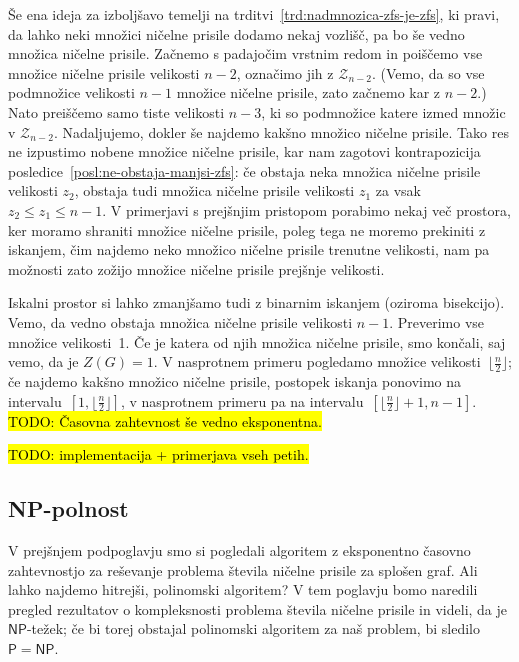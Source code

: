 \documentclass[12pt,a4paper,twoside]{article}
\theoremstyle{definition} %
\theoremstyle{plain} %
\numberwithin{equation}{section}  %
\renewcommand{\P}{\ensuremath{\mathsf{P}}}
\newcommand{\NP}{\ensuremath{\mathsf{NP}}}
\begin{document}
Še ena ideja za izboljšavo temelji na trditvi~\ref{trd:nadmnozica-zfs-je-zfs}, ki pravi, da lahko neki množici ničelne prisile dodamo nekaj vozlišč, pa bo še vedno množica ničelne prisile. Začnemo s padajočim vrstnim redom in poiščemo vse množice ničelne prisile velikosti $n-2$, označimo jih z $\mathcal{Z}_{n-2}$. (Vemo, da so vse podmnožice velikosti $n-1$ množice ničelne prisile, zato začnemo kar z $n-2$.) Nato preiščemo samo tiste velikosti $n-3$, ki so podmnožice katere izmed množic v $\mathcal{Z}_{n-2}$. Nadaljujemo, dokler še najdemo kakšno množico ničelne prisile.
Tako res ne izpustimo nobene množice ničelne prisile, kar nam zagotovi kontrapozicija posledice~\ref{posl:ne-obstaja-manjsi-zfs}: če obstaja neka množica ničelne prisile velikosti $z_2$, obstaja tudi množica ničelne prisile velikosti $z_1$ za vsak $z_2 \leq z_1 \leq n-1$.
V primerjavi s prejšnjim pristopom porabimo nekaj več prostora, ker moramo shraniti množice ničelne prisile, poleg tega ne moremo prekiniti z iskanjem, čim najdemo neko množico ničelne prisile trenutne velikosti, nam pa možnosti zato zožijo množice ničelne prisile prejšnje velikosti.

Iskalni prostor si lahko zmanjšamo tudi z binarnim iskanjem (oziroma bisekcijo). Vemo, da vedno obstaja množica ničelne prisile velikosti $n-1$. Preverimo vse množice velikosti~1. Če je katera od njih množica ničelne prisile, smo končali, saj vemo, da je $Z(G) = 1$. V nasprotnem primeru pogledamo množice velikosti~$\lfloor \frac{n}{2} \rfloor$; če najdemo kakšno množico ničelne prisile, postopek iskanja ponovimo na intervalu~$[1,\lfloor \frac{n}{2} \rfloor]$, v nasprotnem primeru pa na intervalu~$[\lfloor \frac{n}{2} \rfloor + 1, n-1]$. \hl{TODO: Časovna zahtevnost še vedno eksponentna.}

\hl{TODO: implementacija + primerjava vseh petih.}

\subsection{NP-polnost}
\label{subsec:np-polnost}

V prejšnjem podpoglavju smo si pogledali algoritem z eksponentno časovno zahtevnostjo za reševanje problema števila ničelne prisile za splošen graf. Ali lahko najdemo hitrejši, polinomski algoritem? V tem poglavju bomo naredili pregled rezultatov o kompleksnosti problema števila ničelne prisile in videli, da je $\NP$-težek; če bi torej obstajal polinomski algoritem za naš problem, bi sledilo $\P = \NP$. 
\end{document}
